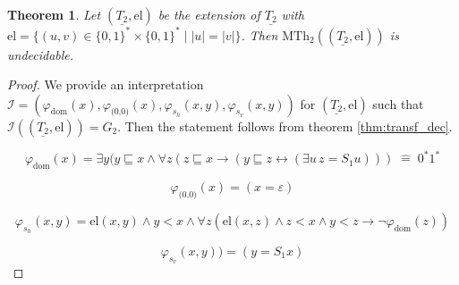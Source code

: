 \documentclass{article}
\newtheorem{theorem}{Theorem}
\begin{document}
\begin{theorem}
	Let $(\underline{T_2}, \text{el})$ be the extension of $\underline{T_2}$ with $\text{el} = \{(u, v) \in \{0,1\}^* \times \{0,1\}^* \mid |u| = |v|\}$. Then $\text{MTh}_2((\underline{T_2}, \text{el}))$ is undecidable.
\end{theorem}
\begin{proof}
	We provide an interpretation $\mathcal{I} = (\varphi_\text{dom}(x), \varphi_\text{(0,0)}(x), \varphi_{s_h}(x, y), \varphi_{s_v}(x, y))$ for $(\underline{T_2}, \text{el})$ such that $\mathcal{I}((\underline{T_2}, \text{el})) = G_2$. Then the statement follows from theorem \ref{thm:transf_dec}.
	
	$$\varphi_\text{dom}(x) = \exists y (y \sqsubseteq x \land \forall z (z \sqsubseteq x \rightarrow (y \sqsubseteq z \leftrightarrow (\exists u \, z = S_1 u))) \;\hat{=}\; 0^*1^*$$
	
	$$\varphi_\text{(0,0)}(x) = (x = \varepsilon)$$
	
	$$\varphi_{s_h}(x, y) = \text{el}(x, y) \land y < x \land \forall z (\text{el}(x, z) \land z < x \land y < z \rightarrow \neg \varphi_\text{dom}(z)) $$
	
	$$\varphi_{s_v}(x, y)) = (y = S_1 x)$$
\end{proof}
\end{document}
